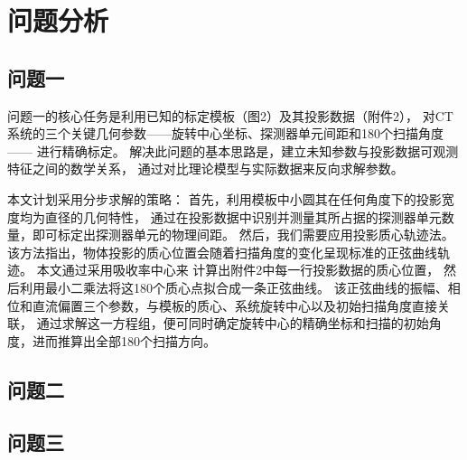 \section{问题分析}
\subsection{问题一}
问题一的核心任务是利用已知的标定模板（图2）及其投影数据（附件2），
对CT系统的三个关键几何参数——旋转中心坐标、探测器单元间距和180个扫描角度 —— 进行精确标定。
解决此问题的基本思路是，建立未知参数与投影数据可观测特征之间的数学关系，
通过对比理论模型与实际数据来反向求解参数。\par
本文计划采用分步求解的策略：
首先，利用模板中小圆其在任何角度下的投影宽度均为直径的几何特性，
通过在投影数据中识别并测量其所占据的探测器单元数量，即可标定出探测器单元的物理间距。
然后，我们需要应用投影质心轨迹法。
该方法指出，物体投影的质心位置会随着扫描角度的变化呈现标准的正弦曲线轨迹。
本文通过采用吸收率中心来
计算出附件2中每一行投影数据的质心位置，
然后利用最小二乘法将这180个质心点拟合成一条正弦曲线。
该正弦曲线的振幅、相位和直流偏置三个参数，与模板的质心、系统旋转中心以及初始扫描角度直接关联，
通过求解这一方程组，便可同时确定旋转中心的精确坐标和扫描的初始角度，进而推算出全部180个扫描方向。

\subsection{问题二}


\subsection{问题三}

